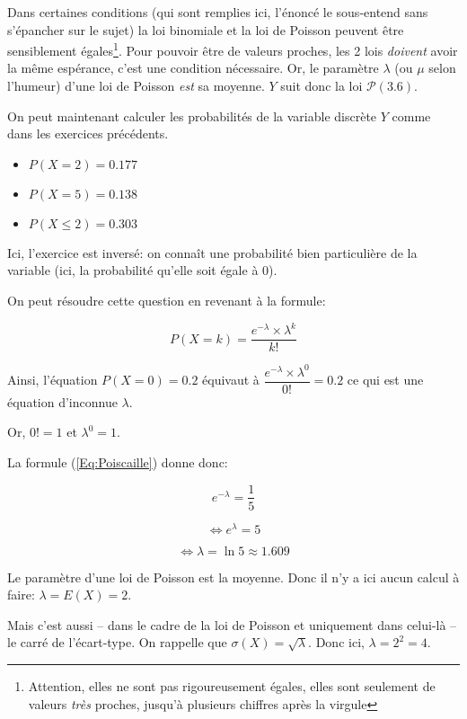 \documentclass[a4paper,12pt]{scrartcl}
\begin{document}
\question{}

\subquestion{}
Dans certaines conditions (qui sont remplies ici, l'énoncé le sous-entend sans s'épancher sur le sujet) la loi binomiale et la loi de Poisson peuvent être sensiblement égales\footnote{Attention, elles ne sont pas rigoureusement égales, elles sont seulement de valeurs \emph{très} proches, jusqu'à plusieurs chiffres après la virgule}. Pour pouvoir être de valeurs proches, les 2 lois \emph{doivent} avoir la même espérance, c'est une condition nécessaire. Or, le paramètre $\lambda$ (ou $\mu$ selon l'humeur) d'une loi de Poisson \emph{est} sa moyenne. $Y$ suit donc la loi $\mathcal{P}(3.6)$.

\subquestion{}
On peut maintenant calculer les probabilités de la variable discrète $Y$ comme dans les exercices précédents. 

\begin{itemize}
 \item $P(X = 2) = 0.177$
 \item $P(X = 5) = 0.138$
 \item $P(X \leqslant 2) = 0.303$
\end{itemize}

\exo{}

\question{}
Ici, l'exercice est inversé: on connaît une probabilité bien particulière de la variable (ici, la probabilité qu'elle soit égale à 0). 

On peut résoudre cette question en revenant à la formule:

\begin{equation}
 P(X=k) = \frac{e^{-\lambda} \times \lambda^k}{k!}
 \label{Eq:Poiscaille}
\end{equation}

Ainsi, l'équation $P(X = 0) = 0.2$ équivaut à $\dfrac{e^{-\lambda} \times \lambda^0}{0!} = 0.2$ ce qui est une équation d'inconnue $\lambda$.

Or, $0! = 1$ et $\lambda^0 = 1$. 

La formule (\ref{Eq:Poiscaille}) donne donc:

$$e^{-\lambda} = \frac{1}{5}$$

$$\Leftrightarrow e^{\lambda} = 5$$

$$\Leftrightarrow \lambda = \ln 5 \approx 1.609$$

\question{}
Le paramètre d'une loi de Poisson est la moyenne. Donc il n'y a ici aucun calcul à faire: $\lambda = E(X) = 2$.

\question{}
Mais c'est aussi -- dans le cadre de la loi de Poisson et uniquement dans celui-là -- le carré de l'écart-type. On rappelle que $\sigma(X) = \sqrt{\lambda}$. Donc ici, $\lambda = 2^2 = 4$.
\end{document}
